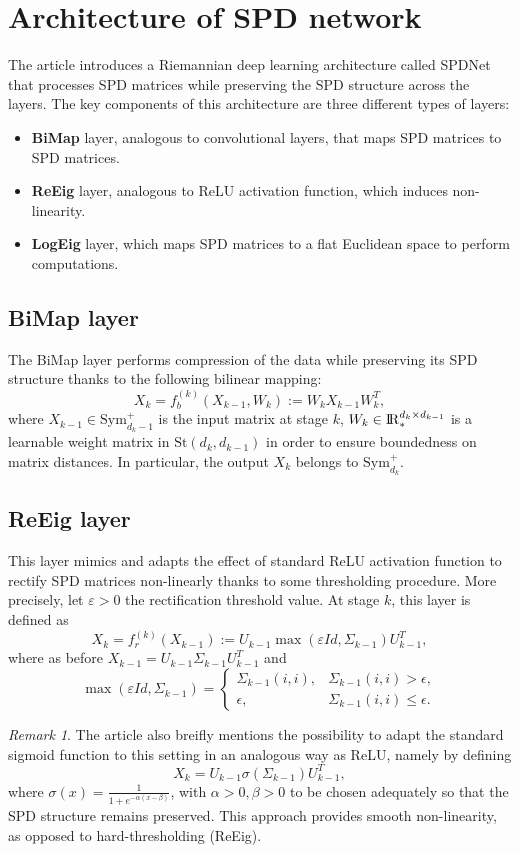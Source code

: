 \documentclass[10pt,a4paper]{book}
\theoremstyle{definition}
\theoremstyle{plain}
\theoremstyle{remark}
\newtheorem{rmk}{Remark}[section]
\newcommand \Stif {\textrm{St}}
\def\R{{\rm I\kern-0.16em R}}
\begin{document}
\section{Architecture of SPD network}
The article introduces a Riemannian deep learning architecture called SPDNet that processes SPD matrices while preserving the SPD structure across the layers. 
The key components of this architecture are three different types of layers:
\begin{itemize}
    \item \textbf{BiMap} layer, analogous to convolutional layers, that maps SPD matrices to SPD matrices.
    \item \textbf{ReEig} layer, analogous to ReLU activation function, which induces non-linearity.
    \item \textbf{LogEig} layer, which maps SPD matrices to a flat Euclidean space to perform computations. 
\end{itemize}
\subsection{BiMap layer}
The BiMap layer performs compression of the data while preserving its SPD structure thanks to the following bilinear mapping:
$$
X_k=f_b^{(k)}(X_{k-1},W_k):=W_kX_{k-1}W_k^T,
$$
where $X_{k-1} \in \text{Sym}_{d_k-1}^{+}$ is the input matrix at stage $k$, $W_k \in \R^{d_k\times d_{k-1}}_{\ast}$ is a learnable weight matrix in $\Stif(d_k,d_{k-1})$ in order to ensure boundedness on matrix distances. 
In particular, the output $X_k$ belongs to $\text{Sym}_{d_k}^{+}$.
\subsection{ReEig layer}
This layer mimics and adapts the effect of standard ReLU activation function to rectify SPD matrices non-linearly thanks to some thresholding procedure. 
More precisely, let $\varepsilon>0$ the rectification threshold value. At stage $k$, this layer is defined as
$$
X_k=f_{r}^{(k)}(X_{k-1}):=U_{k-1}\max(\varepsilon Id, \Sigma_{k-1})U_{k-1}^T,
$$
where as before $X_{k-1}=U_{k-1}\Sigma_{k-1}U_{k-1}^T$ and \[
    \max(\varepsilon Id, \Sigma_{k-1})= \begin{cases}
\Sigma_{k-1}(i,i), & \Sigma_{k-1}(i,i) > \epsilon, \\
\epsilon, & \Sigma_{k-1}(i,i) \leq \epsilon.
\end{cases}
\]
\begin{rmk}
    The article also breifly mentions the possibility to adapt the standard sigmoid function to this setting in an analogous way as ReLU, namely by defining
    $$X_k=U_{k-1}\sigma(\Sigma_{k-1})U_{k-1}^T,$$
    where $\sigma(x)= \displaystyle \frac{1}{1+e^{-\alpha(x-\beta)}}$, with $\alpha>0, \beta>0$ to be chosen adequately so that the SPD structure remains preserved. 
    This approach provides smooth non-linearity, as opposed to hard-thresholding (ReEig).
\end{rmk}
\end{document}
